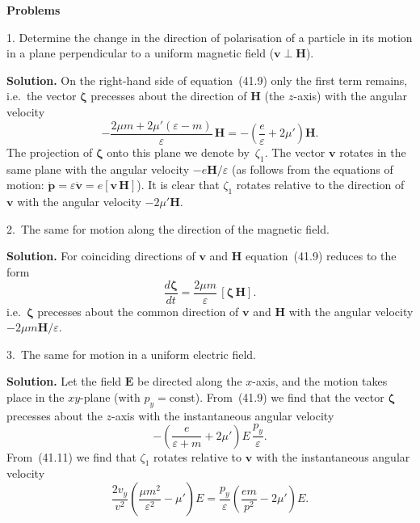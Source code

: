 \begin{center}
\textbf{Problems}
\end{center}

1. Determine the change in the direction of polarisation of a particle in its motion in a plane perpendicular to a uniform magnetic field ($\mathbf{v}\perp\mathbf{H}$).

\textbf{Solution.} On the right-hand side of equation~(41.9) only the first term remains, i.e.\ the vector $\boldsymbol{\zeta}$ precesses about the direction of $\mathbf{H}$ (the $z$-axis) with the angular velocity
\[
-\frac{2\mu m + 2\mu'(\varepsilon - m)}{\varepsilon}\,\mathbf{H} = -\left(\frac{e}{\varepsilon} + 2\mu'\right)\mathbf{H}.
\]
The projection of $\boldsymbol{\zeta}$ onto this plane we denote by~$\zeta_1$. The vector $\mathbf{v}$ rotates in the same plane with the angular velocity $-e\mathbf{H}/\varepsilon$ (as follows from the equations of motion: $\dot{\mathbf{p}} = \varepsilon\dot{\mathbf{v}} = e[\mathbf{v}\,\mathbf{H}]$). It is clear that $\zeta_1$ rotates relative to the direction of $\mathbf{v}$ with the angular velocity $-2\mu'\mathbf{H}$.

2.~The same for motion along the direction of the magnetic field.

\textbf{Solution.} For coinciding directions of $\mathbf{v}$ and $\mathbf{H}$ equation~(41.9) reduces to the form
\[
\frac{d\boldsymbol{\zeta}}{dt} = \frac{2\mu m}{\varepsilon}\,[\boldsymbol{\zeta}\,\mathbf{H}].
\]
i.e.\ $\boldsymbol{\zeta}$ precesses about the common direction of $\mathbf{v}$ and $\mathbf{H}$ with the angular velocity $-2\mu m\mathbf{H}/\varepsilon$.

3.~The same for motion in a uniform electric field.

\textbf{Solution.} Let the field $\mathbf{E}$ be directed along the $x$-axis, and the motion takes place in the $xy$-plane (with $p_y = \mathrm{const}$). From~(41.9) we find that the vector $\boldsymbol{\zeta}$ precesses about the $z$-axis with the instantaneous angular velocity
\[
-\left(\frac{e}{\varepsilon + m} + 2\mu'\right)E\,\frac{p_y}{\varepsilon}.
\]
From~(41.11) we find that $\zeta_1$ rotates relative to $\mathbf{v}$ with the instantaneous angular velocity
\[
\frac{2v_y}{v^2}\!\left(\frac{\mu m^2}{\varepsilon^2} - \mu'\right)E = \frac{p_y}{\varepsilon}\!\left(\frac{em}{p^2} - 2\mu'\right)E.
\]
